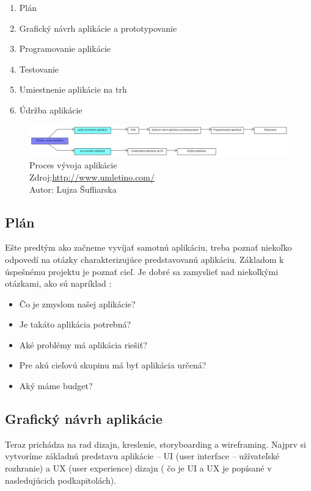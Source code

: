 \documentclass[10pt,twoside,slovak,a4paper]{article}
\begin{document}
	\begin{enumerate}
	\item Plán
	\item Grafický návrh aplikácie a prototypovanie
	\item Programovanie aplikácie
	\item Testovanie
	\item Umiestnenie aplikácie na trh
	\item Údržba aplikácie
	\end{enumerate}

\begin{figure}[h!]
\includegraphics[scale=0.35]{proces_vyvoja_aplikacie}
\caption{Proces vývoja aplikácie
\\ Zdroj:\url{http://www.umletino.com/}
\\ Autor: Lujza Šufliarska}
\end{figure}



\subsection{Plán} \label{}
\quad Ešte predtým ako začneme vyvíjať samotnú aplikáciu, treba poznať niekoľko odpovedí na otázky charakterizujúce predstavovanú aplikáciu. Základom k úspešnému projektu je poznať cieľ. Je dobré sa zamyslieť nad niekoľkými otázkami, ako sú napríklad \cite{EMM1, Synetech}:
\begin{itemize}
\item  Čo je zmyslom našej aplikácie?
\item  Je takáto aplikácia potrebná?
\item Aké problémy má aplikácia riešiť?
\item Pre akú cieľovú skupinu má byť aplikácia určená?
\item Aký máme budget?
\end{itemize}


\subsection{Grafický návrh aplikácie}
\quad Teraz prichádza na rad dizajn, kreslenie, storyboarding a wireframing. Najprv si vytvoríme základnú predstavu aplikácie – UI (user interface – užívateľské rozhranie) a UX (user experience) dizajn ( čo je UI a UX je popísané v nasledujúcich podkapitolách).
\end{document}
